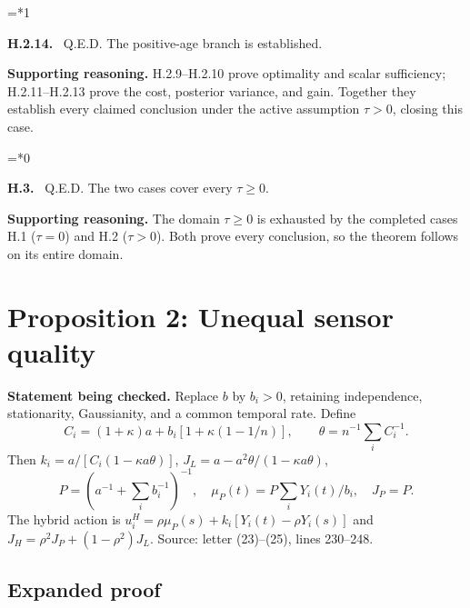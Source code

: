 \documentclass[12pt,letterpaper]{article}
\newenvironment{proofstep}[2]{%
  \begin{list}{}{\leftmargin=\dimexpr 0.17in*#2\relax%
  \setlength{\rightmargin}{0pt}\setlength{\topsep}{5pt}\setlength{\parsep}{2pt}}%
  \item[]\textbf{\textcolor{ink}{#1.}}\ }{\end{list}}
\begin{document}
\begin{proofstep}{H.2.14}{1}
\label{step:H.2.14}
Q.E.D. The positive-age branch is established.

\textbf{Supporting reasoning.}
H.2.9--H.2.10 prove optimality and scalar sufficiency; H.2.11--H.2.13 prove the cost, posterior variance, and gain. Together they establish every claimed conclusion under the active assumption $\tau>0$, closing this case.
\par{}
\end{proofstep}

\begin{proofstep}{H.3}{0}
\label{step:H.3}
Q.E.D. The two cases cover every $\tau\ge0$.

\textbf{Supporting reasoning.}
The domain $\tau\ge0$ is exhausted by the completed cases H.1 ($\tau=0$) and H.2 ($\tau>0$). Both prove every conclusion, so the theorem follows on its entire domain.
\par{}
\end{proofstep}

\clearpage
\section{Proposition 2: Unequal sensor quality}\label{contract-U}

\textbf{Statement being checked.}
Replace $b$ by $b_i>0$, retaining independence, stationarity, Gaussianity, and a common temporal rate. Define
\[
C_i=(1+\kappa)a+b_i[1+\kappa(1-1/n)],\qquad \theta=n^{-1}\sum_i C_i^{-1}.
\]
Then $k_i=a/[C_i(1-\kappa a\theta)]$, $J_L=a-a^2\theta/(1-\kappa a\theta)$,
\[
P=(a^{-1}+\sum_i b_i^{-1})^{-1},\quad
\mu_P(t)=P\sum_iY_i(t)/b_i,\quad J_P=P.
\]
The hybrid action is $u_i^H=\rho\mu_P(s)+k_i[Y_i(t)-\rho Y_i(s)]$ and $J_H=\rho^2J_P+(1-\rho^2)J_L$.
\noindent Source: letter (23)--(25), lines 230--248.

\subsection*{Expanded proof}
\end{document}
